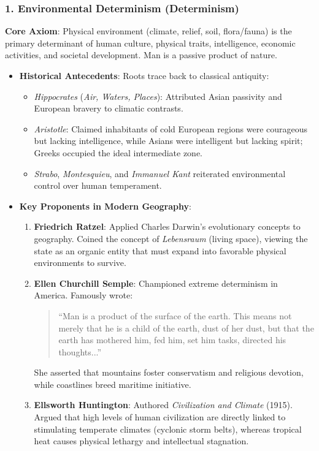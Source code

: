 \documentclass[11pt,a4paper]{article}
\begin{document}
\subsubsection{1. Environmental Determinism (Determinism)}
\begin{keybox}
\textbf{Core Axiom}: Physical environment (climate, relief, soil, flora/fauna) is the primary determinant of human culture, physical traits, intelligence, economic activities, and societal development. Man is a passive product of nature.
\end{keybox}

\begin{itemize}[leftmargin=*]
  \item \textbf{Historical Antecedents}: Roots trace back to classical antiquity:
  \begin{itemize}
    \item \textit{Hippocrates} (\textit{Air, Waters, Places}): Attributed Asian passivity and European bravery to climatic contrasts.
    \item \textit{Aristotle}: Claimed inhabitants of cold European regions were courageous but lacking intelligence, while Asians were intelligent but lacking spirit; Greeks occupied the ideal intermediate zone.
    \item \textit{Strabo}, \textit{Montesquieu}, and \textit{Immanuel Kant} reiterated environmental control over human temperament.
  \end{itemize}
  
  \item \textbf{Key Proponents in Modern Geography}:
  \begin{enumerate}
    \item \textbf{Friedrich Ratzel}: Applied Charles Darwin's evolutionary concepts to geography. Coined the concept of \textit{Lebensraum} (living space), viewing the state as an organic entity that must expand into favorable physical environments to survive.
    \item \textbf{Ellen Churchill Semple}: Championed extreme determinism in America. Famously wrote:
    \begin{quote}
      ``Man is a product of the surface of the earth. This means not merely that he is a child of the earth, dust of her dust, but that the earth has mothered him, fed him, set him tasks, directed his thoughts...''
    \end{quote}
    She asserted that mountains foster conservatism and religious devotion, while coastlines breed maritime initiative.
    \item \textbf{Ellsworth Huntington}: Authored \textit{Civilization and Climate} (1915). Argued that high levels of human civilization are directly linked to stimulating temperate climates (cyclonic storm belts), whereas tropical heat causes physical lethargy and intellectual stagnation.
  \end{enumerate}
  

\end{itemize}
\end{document}
